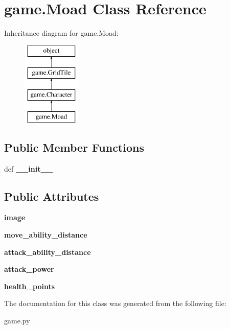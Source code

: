 \hypertarget{classgame_1_1Moad}{\section{game.\-Moad Class Reference}
\label{classgame_1_1Moad}
}
Inheritance diagram for game.\-Moad\-:\begin{figure}[H]
\begin{center}
\leavevmode
\includegraphics[height=4.000000cm]{classgame_1_1Moad}
\end{center}
\end{figure}
\subsection*{Public Member Functions}
\begin{DoxyCompactItemize}
\item 
\hypertarget{classgame_1_1Moad_aab657173104667983ded6c3918ecec3b}{def {\bfseries \-\_\-\-\_\-init\-\_\-\-\_\-}}\label{classgame_1_1Moad_aab657173104667983ded6c3918ecec3b}

\end{DoxyCompactItemize}
\subsection*{Public Attributes}
\begin{DoxyCompactItemize}
\item 
\hypertarget{classgame_1_1Moad_ad1133bb7dea5d6599b604320ff3844fa}{{\bfseries image}}\label{classgame_1_1Moad_ad1133bb7dea5d6599b604320ff3844fa}

\item 
\hypertarget{classgame_1_1Moad_a74e28dcf865aafe1cf6bb55368986028}{{\bfseries move\-\_\-ability\-\_\-distance}}\label{classgame_1_1Moad_a74e28dcf865aafe1cf6bb55368986028}

\item 
\hypertarget{classgame_1_1Moad_aec7bb1129561023ad5e08f621f89aba0}{{\bfseries attack\-\_\-ability\-\_\-distance}}\label{classgame_1_1Moad_aec7bb1129561023ad5e08f621f89aba0}

\item 
\hypertarget{classgame_1_1Moad_a176ec7ca641ea1e8f6d322c58dd1c3d2}{{\bfseries attack\-\_\-power}}\label{classgame_1_1Moad_a176ec7ca641ea1e8f6d322c58dd1c3d2}

\item 
\hypertarget{classgame_1_1Moad_a9cb430c08b2a176133d925850569ee70}{{\bfseries health\-\_\-points}}\label{classgame_1_1Moad_a9cb430c08b2a176133d925850569ee70}

\end{DoxyCompactItemize}


The documentation for this class was generated from the following file\-:\begin{DoxyCompactItemize}
\item 
game.\-py\end{DoxyCompactItemize}
